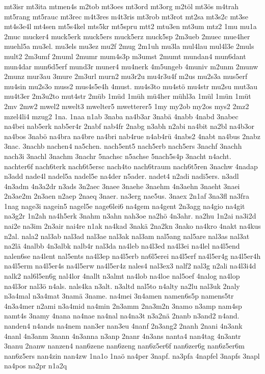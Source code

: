 {mt3isr
mt3ita
mtmen4s
m2tob
mt3oes
mt3ord
mt3org
m2töl
mt3ös
m4trah
mt5rang
mt5rauc
mt3rec
m4t3res
m4t3ris
mt3rob
mt3rot
mt2sa
mt3s2c
mt3se
mt4s3e4l
mt4sen
mt5s4kel
mts5kr
mt5spru
mtt2
mtu3en
mt3um
mtz2
1mu
mu1a
2muc
mucker4
muck5erk
muck5ers
muck5erz
muck5sp
2m3ueb
2muec
mue4her
muehl5a
mu3el.
mu3els
mu3ez
mu2f
2mug
2m1uh
mu3la
mul4lau
mul4l3e
2muls
mult2
2m3umf
2muml
2mumr
mum4s3p
m3umst
2mumt
mundan4
mun6dant
mun4dar
mun6d5erf
mund3r
muner4
mu4nerk
4m5ungeb
4muniv
m2unm
2munw
2munz
mur3au
3mure
2m3url
murn2
mu3r2u
mu4r3u4f
m2us
mu2s3a
mus5erf
mu4sin
mu2s3o
muss2
mus4s5e4h
4must.
mu4s3to
mu4stö
mu4str
mu2su
mut3au
mu4t3er
2m3u2to
mut4str
2müb
1müd
1müh
mü4her
mühl3a
1mül
1mün
1müt
2mv
2mw2
mwel2
mwelt3
mwelter5
mwetterer5
1my
my2ob
my2os
mys2
2mz2
mzel4li4
mzug2
1na.
1naa
n1ab
3naba
na4b3ar
3nabä
4nabb
4nabd
3nabec
na4bei
nab5erk
nab5er4r
2nabf
nab4fr
2nabg
n3abh
n2abi
na4bit
na2bl
na4b3or
na4bos
3nabö
na4bra
na4bre
na4bri
nab4rue
n4ab4rü
4nabs2
4nabt
na4bus
2nabz
3nac.
3nachb
nachen4
na5chen.
nach5ent5
nach5erb
nach5ers
3nachf
3nachh
nach3i
3nachl
3nachm
3nachr
5nachsc
n5achse
5nach5s4p
3nacht
n4acht.
nachter6f
nach6terk
nach6t5ersc
nach4to
nach6traum
nach6t5ren
3nachw
4nadap
n3add
nade4l
nadel5a
nadel5e
na4der
n5ader.
nadet4
n2adi
nadi5ers.
n3adl
4n3adm
4n3a2dr
n3ads
3n2aec
3naee
3naehe
3naehm
4n3aehn
3naeht
3naei
2n3ae2m
2n3aen
n2aep
2naeq
3naer.
na3erg
nae5us.
3naex
2n1af
3na3fl
na3fra
1nag
nage3i
nagein5
nagel5e
nage6lei6
na4gem
na4gent
2n3agg
na4gio
na4git
na3g2r
1n2ah
na4h5erk
3nahm
n3ahn
nah3oe
na2hö
4n3ahr.
na2hu
1n2ai
na3i2d
nai2e
na3im
2n3air
nai4re
n1ak
na4kad
3nakä
2na2kn
3nako
na4kro
4nakt
na4kus
n2al.
nala2
nal3ab
nal3ad
nal3ae
nal3ak
nal3am
nal5ang
nal5are
nal3as
nal3at
na2lä
4nalbb
4n3albk
nalb4r
nal3da
na4leb
na4l3ed
na4l3ei
na4lel
na4l5end
nalen6se
na4lent
nal5ents
na4l3ep
na4l5erb
na6l5erei
na4l5erf
na4l5er4g
na4l5er4h
na4l5erm
na4l5er4s
na4l5erw
na4l5er4z
nales4
nal3ex3
nalf2
nal3g
n2ali
na4l3i4d
nalk2
nal6l5en6g
nal4lor
4nallt
n3almt
na4lob
na4loe
nal5oef
4nalog
na4lop
na4l3or
nal3ö
n4als.
nals4ka
n3alt.
n3altd
nal5to
n4alty
na2lu
nal3uk
2naly
n3a4mal
n3a4mat
3namä
3name.
na4mei
3n4amen
namen6s5p
namens5tr
4n3a4mer
n2ami
n3a4mid
na4min
2n3amm
2na3m2n
3namo
n3amp
nam4sp
namt4s
3namy
4nana
na4nae
na4nal
na4na3t
n3a2nä
2nanb
n3and2
n4and.
nanden4
n4ands
na4nem
nan3er
nan3eu
4nanf
2n3ang2
2nanh
2nani
4n3ank
4nanl
4n3anm
3nann
4n3anna
n3anp
2nanr
4n3ans
nanta4
nan4tag
4n3antr
3nanu
2nanw
nanzen4
nan6zene
nan6zeng
nan6z5er6f
nan6zer6g
nan6z5er6m
nan6z5ers
nan4zin
nan4zw
1na1o
1naö
na4per
3napf.
na3pfa
4napfel
3napfs
3napl
na4pos
na2pr
n1a2q
}
